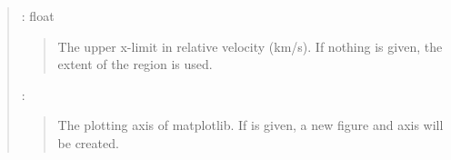 \documentclass[letterpaper,10pt,english]{sphinxmanual}
\begin{document}
\begin{fulllineitems}
\begin{quote}
\begin{description}
 : float
\begin{quote}

The upper x-limit in relative velocity (km/s).
If nothing is given, the extent of the region is used.
\end{quote}

 : 
\begin{quote}

The plotting axis of matplotlib.
If  is given, a new figure and axis will be created.
\end{quote}

\end{description}\end{quote}

\end{fulllineitems}

\end{document}

